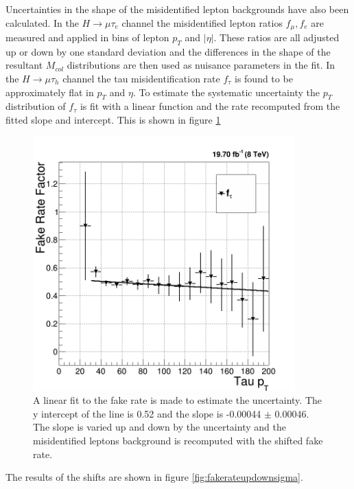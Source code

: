 \documentclass[oneside, letterpaper, oldfontcommands]{memoir}
\begin{document}
\qquad Uncertainties in the shape of the misidentified lepton backgrounds have also been calculated. In the $H \rightarrow \mu\tau_{e}$ channel the misidentified lepton ratios $f_{\mu},f_{e}$ are measured and applied in bins of lepton $p_{T}$ and $|\eta|$. These ratios are all adjusted up or down by one standard deviation and the differences in the shape of the resultant $M_{col}$ distributions are then used as nuisance parameters in the fit. In the $H \rightarrow \mu\tau_{h}$ channel the tau misidentification rate $f_{\tau}$ is found to be approximately flat in $p_{T}$ and $\eta$. To estimate the systematic uncertainty the $p_{T}$ distribution of $f_{\tau}$ is fit with a linear function and the rate recomputed from the fitted slope and intercept. This is shown in figure \ref{fig:fakeratesys8TeV}
\begin{figure}[hbtp]\centering
\includegraphics[width=0.9\textwidth]{FakeFitLine.png}

\caption{A linear fit to the fake rate is made to estimate the uncertainty. The y intercept of the line is 0.52 and the slope is -0.00044 $\pm$ 0.00046. The slope is varied up and down by the uncertainty and the misidentified leptons background is recomputed with the shifted fake rate.}
\label{fig:fakeratesys8TeV}\end{figure}

The results of the shifts are shown in figure \ref{fig:fakerateupdownsigma}.
\end{document}
